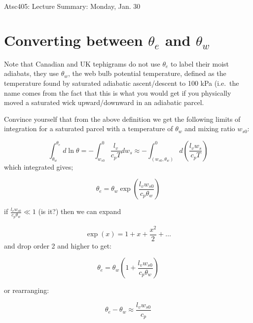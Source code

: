 \documentclass[12pt]{article}
\begin{document}
\pagestyle{first}

\begin{center}
Atsc405: Lecture Summary: Monday, Jan. 30\\
\end{center}




\section{Converting between $\theta_e$ and $\theta_w$}

Note that Canadian and  UK  tephigrams  do not use $\theta_e$ to label their moist
adiabats, they use $\theta_w$, the web bulb potential temperature, defined
as the temperature found by saturated adiabatic ascent/descent to 100 kPa
(i.e.~the name comes from the fact that this is what you would get
if you physically moved a saturated wick upward/downward in an adiabatic
parcel.

Convince yourself that from the above definition we get the following limits
of integration for a saturated parcel with a temperature of $\theta_w$ 
and mixing ratio $w_{s0}$:

\begin{equation}
\label{eq:thetaodew}
\int_{\theta_w}^{\theta_e} d \ln \theta = -\int_{w_{s0}}^0 \frac{l_v}{c_p T} d w_s \approx - 
\int_{(w_{s0},\theta_w)}^0 d \left ( \frac{l_v w_s}{c_p T} \right )  
\end{equation}
which integrated gives;

\begin{equation}
  \label{eq:thetaint}
  \theta_e = \theta_w \exp \left ( \frac{l_v w_{s0}}{c_p \theta_w} \right )
\end{equation}

if $ \frac{l_v w_{s0}}{c_p \theta_w} \ll 1$ (is it?) then we can expand

\begin{equation}
  \label{eq:exp}
  \exp(x) = 1 + x + \frac{x^2}{2} + \ldots
\end{equation}
and drop order 2 and higher to get:

\begin{equation}
  \label{eq:expand}
  \theta_e=\theta_w \left ( 1 + \frac{l_v w_{s0}}{c_p \theta_w} \right )
\end{equation}

or rearranging:

\begin{equation}
  \label{eq:expand2}
  \theta_e - \theta_w  \approx  \frac{l_v w_{s0}}{c_p}
\end{equation}
\end{document}
